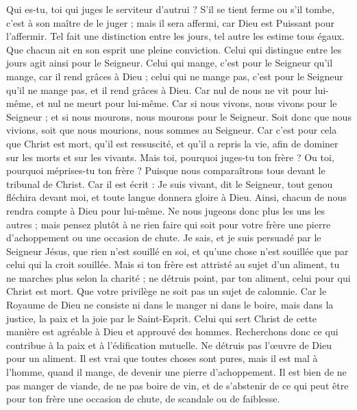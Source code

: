 \begin{multicols}{2}
Qui es-tu, toi qui juges le serviteur d'autrui ? S’il se tient ferme ou s'il tombe, c’est à son maître de le juger ; mais il sera affermi, car Dieu est Puissant pour l'affermir.
Tel fait une distinction entre les jours, tel autre les estime tous égaux. Que chacun ait en son esprit une pleine conviction.
Celui qui distingue entre les jours agit ainsi pour le Seigneur. Celui qui mange, c’est pour le Seigneur qu’il mange, car il rend grâces à Dieu ; celui qui ne mange pas, c’est pour le Seigneur qu’il ne mange pas, et il rend grâces à Dieu.
Car nul de nous ne vit pour lui-même, et nul ne meurt pour lui-même.
Car si nous vivons, nous vivons pour le Seigneur ; et si nous mourons, nous mourons pour le Seigneur. Soit donc que nous vivions, soit que nous mourions, nous sommes au Seigneur.
Car c'est pour cela que Christ est mort, qu'il est ressuscité, et qu'il a repris la vie, afin de dominer sur les morts et sur les vivants.
Mais toi, pourquoi juges-tu ton frère ? Ou toi, pourquoi méprises-tu ton frère ? Puisque nous comparaîtrons tous devant le tribunal de Christ.
Car il est écrit : Je suis vivant, dit le Seigneur, tout genou fléchira devant moi, et toute langue donnera gloire à Dieu.
 Ainsi, chacun de nous rendra compte à Dieu pour lui-même.
Ne nous jugeons donc plus les uns les autres ; mais pensez plutôt à ne rien faire qui soit pour votre frère une pierre d’achoppement ou une occasion de chute.
Je sais, et je suis persuadé par le Seigneur Jésus, que rien n'est souillé en soi, et qu’une chose n’est souillée que par celui qui la croit souillée.
Mais si ton frère est attristé au sujet d’un aliment, tu ne marches plus selon la charité ; ne détruis point, par ton aliment, celui pour qui Christ est mort.
Que votre privilège ne soit pas un sujet de calomnie.
Car le Royaume de Dieu ne consiste ni dans le manger ni dans le boire, mais dans la justice, la paix et la joie par le Saint-Esprit.
Celui qui sert Christ de cette manière est agréable à Dieu et approuvé des hommes.
Recherchons donc ce qui contribue à la paix et à l’édification mutuelle.
Ne détruis pas l’œuvre de Dieu pour un aliment. Il est vrai que toutes choses sont pures, mais il est mal à l’homme, quand il mange, de devenir une pierre d’achoppement.
Il est bien de ne pas manger de viande, de ne pas boire de vin, et de s’abstenir de ce qui peut être pour ton frère une occasion de chute, de scandale ou de faiblesse.

\end{multicols}
